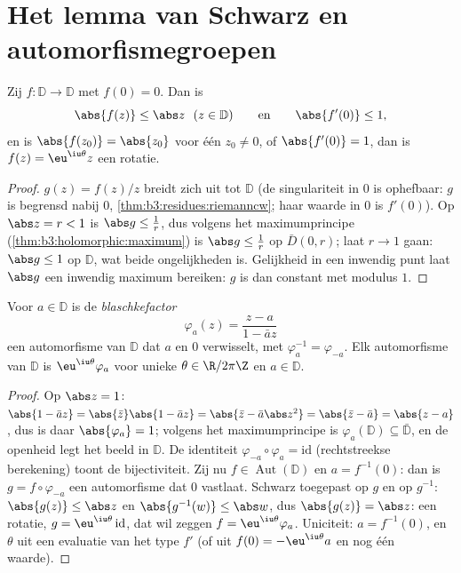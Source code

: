 \section{Het lemma van Schwarz en automorfismegroepen}

\begin{theorem}\label{thm:b3:conformal:schwarz}
Zij $f \colon \mathbb D \to \mathbb D$  met $f(0) = 0$.
Dan is
\[
\abs{f(z)} \leq \abs z \ \ (z \in \mathbb D)
\qquad\text{en}\qquad \abs{f'(0)} \leq 1 ,
\]
en is $\abs{f(z_0)} = \abs{z_0}$ voor één $z_0 \neq 0$, of
$\abs{f'(0)} = 1$, dan is $f(z) = \eu^{\iu\theta}z$ een rotatie.
\end{theorem}

\begin{proof}
$g(z) = f(z)/z$ breidt zich  uit tot $\mathbb D$ (de
singulariteit in $0$ is ophefbaar: $g$ is begrensd nabij $0$,
\cref{thm:b3:residues:riemanncw}; haar waarde in $0$ is $f'(0)$).
Op $\abs z = r < 1$ is $\abs g \leq \frac1r$, dus volgens het
maximumprincipe (\cref{thm:b3:holomorphic:maximum}) is $\abs g
\leq \frac1r$ op $\bar D(0,r)$; laat $r \to 1$ gaan: $\abs g \leq
1$ op $\mathbb D$, wat beide ongelijkheden is. Gelijkheid in een
inwendig punt laat $\abs g$ een inwendig maximum bereiken: $g$ is
dan constant met modulus $1$.
\end{proof}

\begin{theorem}
\label{thm:b3:conformal:autdisc}
Voor $a \in \mathbb D$ is de
\emph{blaschkefactor}
\[
\varphi_a(z) = \frac{z - a}{1 - \bar a z}
\]
een automorfisme van $\mathbb D$ dat $a$ en $0$ verwisselt, met
$\varphi_a^{-1} = \varphi_{-a}$. Elk automorfisme van $\mathbb D$
is $\eu^{\iu\theta}\varphi_a$ voor unieke $\theta \in \R/2\pi\Z$
en $a \in \mathbb D$.
\end{theorem}

\begin{proof}
Op $\abs z = 1$: $\abs{1 - \bar az} = \abs{\bar z}\abs{1 - \bar
az} = \abs{\bar z - \bar a\abs z^2} = \abs{\bar z - \bar a} =
\abs{z - a}$, dus is daar $\abs{\varphi_a} = 1$; volgens het
maximumprincipe is $\varphi_a(\mathbb D) \subseteq \bar{\mathbb
D}$, en de openheid legt het beeld in $\mathbb D$. De
 identiteit $\varphi_{-a}\circ\varphi_a =
\mathrm{id}$ (rechtstreekse berekening) toont de bijectiviteit.
Zij nu $f \in \operatorname{Aut}(\mathbb D)$ en $a = f^{-1}(0)$:
dan is $g = f\circ\varphi_{-a}$ een automorfisme dat $0$ vastlaat.
Schwarz toegepast op $g$ en op $g^{-1}$: $\abs{g(z)} \leq \abs z$
en $\abs{g^{-1}(w)} \leq \abs w$, dus $\abs{g(z)} = \abs z$: een
rotatie, $g = \eu^{\iu\theta}\,\mathrm{id}$, dat wil zeggen $f =
\eu^{\iu\theta}\varphi_a$. Uniciteit: $a = f^{-1}(0)$, en
$\theta$ uit een evaluatie van het type $f'$ (of uit $f(0) =
-\eu^{\iu\theta}a$ en nog één waarde).
\end{proof}

